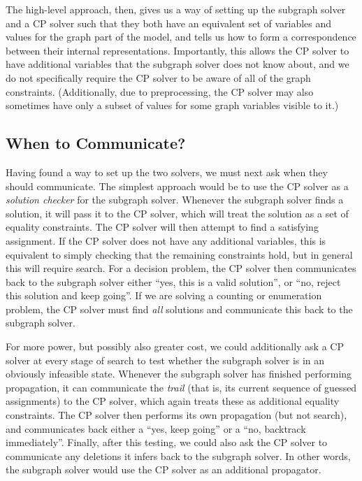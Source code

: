 \documentclass[runningheads]{llncs}
\begin{document}
The high-level approach, then, gives us a way of setting up the subgraph solver and a CP solver such
that they both have an equivalent set of variables and values for the graph part of the model,
and tells us how to form a correspondence between their internal representations. Importantly, this
allows the CP solver to have additional variables that the subgraph solver does not know about, and
we do not specifically require the CP solver to be aware of all of the graph constraints.
(Additionally, due to preprocessing, the CP solver may also sometimes have only a subset of values
for some graph variables visible to it.)

\subsection{When to Communicate?}

Having found a way to set up the two solvers, we must next ask when they should communicate. The
simplest approach would be to use the CP solver as a \emph{solution checker} for the subgraph
solver.  Whenever the subgraph solver finds a solution, it will pass it to the CP solver, which will
treat the solution as a set of equality constraints. The CP solver will then attempt to find a
satisfying assignment. If the CP solver does not have any additional variables, this is equivalent
to simply checking that the remaining constraints hold, but in general this will require search.
For a decision problem, the CP solver then communicates back to the subgraph solver either ``yes,
this is a valid solution'', or ``no, reject this solution and keep going''. If we are solving a
counting or enumeration problem, the CP solver must find \emph{all} solutions and communicate this
back to the subgraph solver.

For more power, but possibly also greater cost, we could additionally ask a CP solver at every stage
of search to test whether the subgraph solver is in an obviously infeasible state.  Whenever the
subgraph solver has finished performing propagation, it can communicate the \emph{trail} (that is,
its current sequence of guessed assignments) to the CP solver, which again treats these as
additional equality constraints. The CP solver then performs its own propagation (but not search),
and communicates back either a ``yes, keep going'' or a ``no, backtrack immediately''.  Finally,
after this testing, we could also ask the CP solver to communicate any deletions it infers back to
the subgraph solver. In other words, the subgraph solver would use the CP solver as an additional
propagator.
\end{document}
